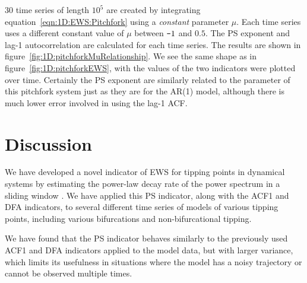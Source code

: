 {{{		$30$ time series of length $10^5$ are created by integrating equation~\ref{eqn:1D:EWS:Pitchfork} using a \emph{constant} parameter $\mu$. Each time series uses a different constant value of $\mu$ between $\textup{\texttt{-}}1$ and $0.5$. The PS exponent and lag-1 autocorrelation are calculated for each time series. The results are shown in figure~\ref{fig:1D:pitchforkMuRelationship}. We see the same shape as in figure~\ref{fig:1D:pitchforkEWS}, with the values of the two indicators were plotted over time. Certainly the PS exponent are similarly related to the parameter of this pitchfork system just as they are for the AR(1) model, although there is much lower error involved in using the lag-1 ACF.
	}}






\section{Discussion}
\label{sec:1D:discussion}

We have developed a novel indicator of EWS for tipping points in dynamical systems by estimating the power-law decay rate of the power spectrum in a sliding window \citep{prettyman2018}. {} We have applied this PS indicator, along with the ACF1 and DFA indicators, to several different time series of models of various tipping points, including various bifurcations and non-bifurcational tipping. 

We have found that the PS indicator behaves similarly to the previously used ACF1 and DFA indicators applied to the model data, but with larger variance, which limits its usefulness in situations where the model has a noisy trajectory or cannot be observed multiple times.

}

